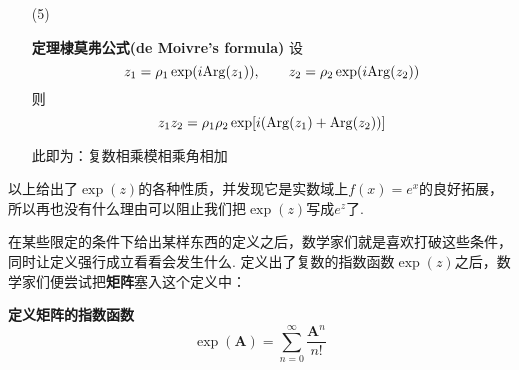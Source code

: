 \documentclass[UTF8]{ctexart}
\newenvironment{definition}[1]
    {\begin{tcolorbox}[enhanced, colback=LightYellow, breakable=false, frame hidden, borderline west={1.5mm}{-2mm}{DarkGreen}]
    {\bfseries {\color{DarkGreen} 定义}\quad #1} \newline}
    {\end{tcolorbox}}
\newenvironment{theorem}[1]
    {\begin{tcolorbox}[enhanced, colback=LightYellow, breakable=true, frame hidden, borderline west={1.5mm}{-2mm}{DarkBlue}]
    {\bfseries {\color{DarkBlue} 定理}\quad #1} \newline}
    {\end{tcolorbox}}
\begin{document}
\begin{itemize}
    \textit{
        证明：代入欧拉公式即可，需要用到如下两个三角恒等式：
        \[\sin(\arctan(x))=\frac{x}{\sqrt{1+x^2}},\qquad \cos(\arctan(x))=\frac{1}{\sqrt{1+x^2}}\]
    }
    \begin{align*}
        \sqrt{a^2+b^2}\exp\left(i\arctan\frac{b}{a}\right) &= 
        \sqrt{a^2+b^2}\left[\cos\left(\arctan\frac{b}{a}\right)+i\sin\left(\arctan\frac{b}{a}\right)\right] \\
        &=\sqrt{a^2+b^2}\left[\frac{a}{\sqrt{a^2+b^2}}+\frac{ib}{\sqrt{a^2+b^2}}\right] = a+ib
    \end{align*}
    \textit{
        由于\(|\exp(ix)|\equiv 1\)，所以只要限定\(a^2+b^2\)为常数，那么复数\(a+ib\)取值的集合就是一个圆心在原点、半径为\(\rho=|a+ib|\)的圆，此时可以将复平面转化为极坐标系，复数（相当于向量）就可以由极径和极角来确定，因此可以做出以下定义。
    }
    \begin{definition}{复数的指数形式}
        令\(z=a+ib\)，则\(z=\rho\exp(i{\rm Arg}(z))\)，其中\(\rho=\sqrt{a^2+b^2}\)是复数的\uline{模}(modulo)；\({\rm Arg}(z)\)称为复数的\uline{辐角}(argument)，其定义为 
        \[{\rm Arg}(z) = \left\{
        \begin{aligned}  
            & \frac{\pi}{2} + 2k\pi, & a =0, b > 0 \\ 
            & -\frac{\pi}{2} + 2k\pi, & a = 0, b < 0  \\ 
            & \arctan\frac{b}{a}+2k\pi, & a \neq 0
        \end{aligned}
        \right. \qquad \mbox{其中} k \in \mathbb{Z} 
        \]
        \({\rm Arg}(z)\)在\([-\pi,\pi)\)上的值称为辐角主值，写作\({\rm arg}(z)\).
    \end{definition}
    尽管\({\rm Arg}(z)\)是分段定义的，但它其实是连续函数.
    \item[(5)]
    \begin{theorem}{棣莫弗公式(de Moivre's formula)}
        设
        \[z_1=\rho_1\exp(i{\rm Arg}(z_1)), \qquad z_2=\rho_2\exp(i{\rm Arg}(z_2))\]
        则
        \[z_1z_2=\rho_1\rho_2\exp[i({\rm Arg}(z_1)+{\rm Arg}(z_2))]\]
    \end{theorem}
    此即为：复数相乘模相乘角相加
\end{itemize}

以上给出了\(\exp(z)\)的各种性质，并发现它是实数域上\(f(x)=e^x\)的良好拓展，所以再也没有什么理由可以阻止我们把\(\exp(z)\)写成\(e^z\)了.

\vspace{1cm}

在某些限定的条件下给出某样东西的定义之后，数学家们就是喜欢打破这些条件，同时让定义强行成立看看会发生什么. 定义出了复数的指数函数\(\exp(z)\)之后，数学家们便尝试把\textbf{矩阵}塞入这个定义中：
\begin{definition}{矩阵的指数函数}
    \[\exp({\bm A}) = \sum_{n=0}^{\infty}\frac{{\bm A}^n}{n!}\]
\end{definition}
\end{document}
